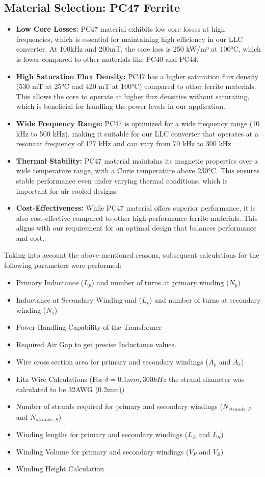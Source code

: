 \subsection{Material Selection: PC47 Ferrite}
\begin{itemize}
    \item \textbf{Low Core Losses:} PC47 material exhibits low core losses at high frequencies, which is essential for maintaining high efficiency in our LLC converter. At 100kHz and 200mT, the core loss is 250 kW/m³ at 100°C, which is lower compared to other materials like PC40 and PC44.
    \item \textbf{High Saturation Flux Density:} PC47 has a higher saturation flux density (530 mT at 25°C and 420 mT at 100°C) compared to other ferrite materials. This allows the core to operate at higher flux densities without saturating, which is beneficial for handling the power levels in our application.
    \item \textbf{Wide Frequency Range:} PC47 is optimized for a wide frequency range (10 kHz to 500 kHz), making it suitable for our LLC converter that operates at a resonant frequency of 127 kHz and can vary from 70 kHz to 300 kHz.
    \item \textbf{Thermal Stability:} PC47 material maintains its magnetic properties over a wide temperature range, with a Curie temperature above 230°C. This ensures stable performance even under varying thermal conditions, which is important for air-cooled designs.
    \item \textbf{Cost-Effectiveness:} While PC47 material offers superior performance, it is also cost-effective compared to other high-performance ferrite materials. This aligns with our requirement for an optimal design that balances performance and cost.
\end{itemize}
Taking into account the above-mentioned reasons, subsequent calculations for the following parameters were performed:
\begin{itemize}
    \item Primary Inductance ($L_p$) and number of turns at primary winding ($N_p$)
    \item Inductance at Secondary Winding and ($L_s$) and number of turns at secondary winding ($N_s$)
    \item Power Handling Capability of the Transformer
    \item Required Air Gap to get precise Inductance values.
    \item Wire cross section area for primary and secondary windings ($A_p$ and $A_s$)
    \item Litz Wire Calculations (For $\delta = 0.1mm, 300kHz$ the strand diameter was calculated to be 32AWG (0.2mm))
    \item Number of strands required for primary and secondary windings ($N_{strands,P}$ and $N_{strands,S}$)
    \item Winding lengths for primary and secondary windings ($L_P$ and $L_S$)
    \item Winding Volume for primary and secondary windings ($V_P$ and $V_S$)
    \item Winding Height Calculation
\end{itemize}
